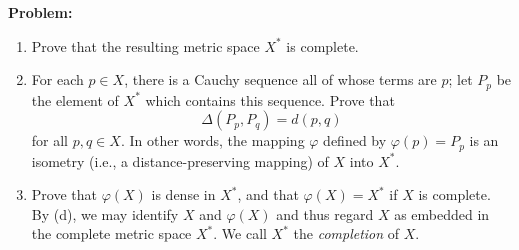 \documentclass[10pt]{article}
\newenvironment{problem}{\textbf{Problem:}}{}
\begin{document}
\begin{problem}
\begin{enumerate}[label=\alph*)]
			\item Prove that the resulting metric space \( X^{*} \) is complete. 
			\item For each \( p\in X \), there is a Cauchy sequence all of whose terms are \( p \); let \( P_p \) 
				be the element of \( X^{*} \) which contains this sequence. Prove that 
				\[
				\Delta(P_p, P_q) = d(p, q)
				\] 
				for all \( p, q \in X \). In other words, the mapping \( \varphi \) defined by \( \varphi(p) = P_p \) 
				is an isometry (i.e., a distance-preserving mapping) of \( X \) into \( X^{*} \). 
			\item Prove that \( \varphi(X) \) is dense in \( X^{*} \), and that \( \varphi(X) = X^{*} \) if 
				\( X \) is complete. By (d), we may identify \( X \) and \( \varphi(X) \) and thus regard \( X \) 
				as embedded in the complete metric space \( X^{*} \). We call \( X^{*} \) the 
				\textit{completion} of \( X \).
		\end{enumerate}
	\end{problem}
\end{document}
